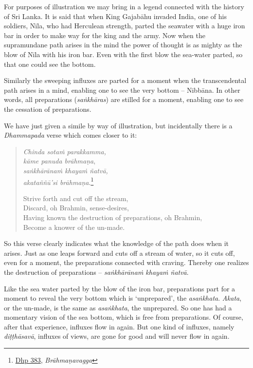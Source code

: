 For purposes of illustration we may bring in a legend connected with the history of Sri Lanka. It is said that when King Gajabāhu invaded India, one of his soldiers, Nīla, who had Herculean strength, parted the seawater with a huge iron bar in order to make way for the king and the army. Now when the supramundane path arises in the mind the power of thought is as mighty as the blow of Nīla with his iron bar. Even with the first blow the sea-water parted, so that one could see the bottom.

Similarly the sweeping influxes are parted for a moment when the transcendental path arises in a mind, enabling one to see the very bottom -- Nibbāna. In other words, all preparations (\emph{saṅkhāras}) are stilled for a moment, enabling one to see the cessation of preparations.

We have just given a simile by way of illustration, but incidentally there is a \emph{Dhammapada} verse which comes closer to it:

\begin{quote}
\emph{Chinda sotaṁ parakkamma,}\\
\emph{kāme panuda brāhmaṇa},\\
\emph{saṅkhārānaṁ khayaṁ ñatvā,}\\
\emph{akataññū'si brāhmaṇa}.\footnote{\href{https://suttacentral.net/dhp383-423/pli/ms}{Dhp 383}, \emph{Brāhmaṇavagga}}

Strive forth and cut off the stream,\\
Discard, oh Brahmin, sense-desires,\\
Having known the destruction of preparations, oh Brahmin,\\
Become a knower of the un-made.
\end{quote}

So this verse clearly indicates what the knowledge of the path does when it arises. Just as one leaps forward and cuts off a stream of water, so it cuts off, even for a moment, the preparations connected with craving. Thereby one realizes the destruction of preparations -- \emph{saṅkhārānaṁ khayaṁ ñatvā}.

Like the sea water parted by the blow of the iron bar, preparations part for a moment to reveal the very bottom which is `unprepared', the \emph{asaṅkhata}. \emph{Akata}, or the un-made, is the same as \emph{asaṅkhata}, the unprepared. So one has had a momentary vision of the sea bottom, which is free from preparations. Of course, after that experience, influxes flow in again. But one kind of influxes, namely \emph{diṭṭhāsavā}, influxes of views, are gone for good and will never flow in again.

